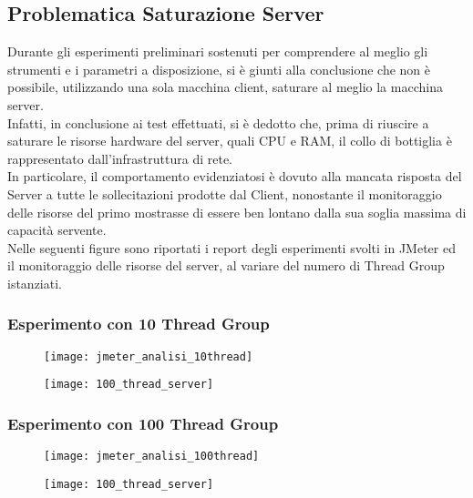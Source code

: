 \subsection{Problematica Saturazione Server}
Durante gli esperimenti preliminari sostenuti per comprendere al meglio gli strumenti
e i parametri a disposizione, si è giunti alla conclusione che non è possibile,
utilizzando una sola macchina client, saturare al meglio la macchina server.\\
Infatti, in conclusione ai test effettuati, si è dedotto che, prima di riuscire
a saturare le risorse hardware del server, quali CPU e RAM, il collo di bottiglia
è rappresentato dall'infrastruttura di rete.\\
In particolare, il comportamento evidenziatosi è dovuto alla mancata risposta
del Server a tutte le sollecitazioni prodotte dal Client, nonostante
il monitoraggio delle risorse del primo mostrasse di essere ben lontano
dalla sua soglia massima di capacità servente.\\
Nelle seguenti figure sono riportati i report degli esperimenti svolti in JMeter
ed il monitoraggio delle risorse del server, al variare del numero di Thread Group
istanziati.\\

\subsubsection{Esperimento con 10 Thread Group}
\begin{minipage}{\linewidth}
  \centering
  \begin{minipage}{1\linewidth}
    \begin{figure}[H]
      \texttt{[image: jmeter\_analisi\_10thread]}
    \end{figure}
  \end{minipage}
  \begin{minipage}{1\linewidth}
    \begin{figure}[H]
      \texttt{[image: 100\_thread\_server]}
    \end{figure}
  \end{minipage}
\end{minipage}

\subsubsection{Esperimento con 100 Thread Group}
\begin{minipage}{\linewidth}
  \centering
  \begin{minipage}{1\linewidth}
    \begin{figure}[H]
      \texttt{[image: jmeter\_analisi\_100thread]}
    \end{figure}
  \end{minipage}
  \begin{minipage}{1\linewidth}
    \begin{figure}[H]
      \texttt{[image: 100\_thread\_server]}
    \end{figure}
  \end{minipage}
\end{minipage}

